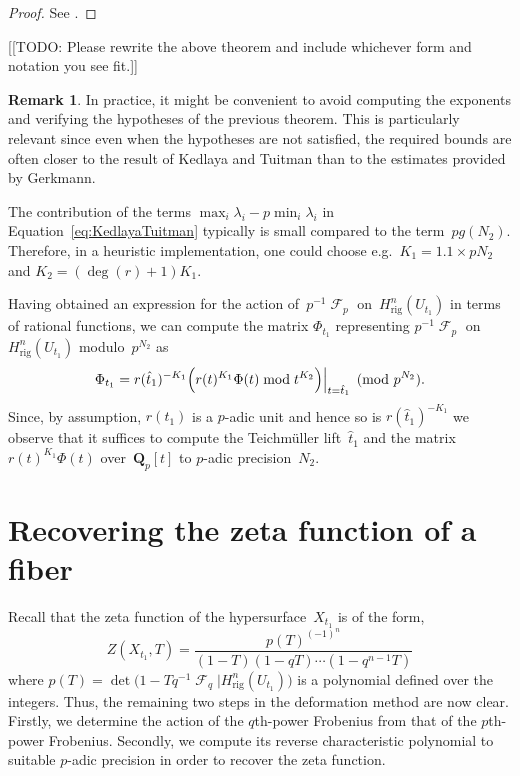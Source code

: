 \documentclass[a4paper,11pt]{article}
\numberwithin{equation}{section}
\DeclareMathOperator{\Frob}{\mathcal{F}} %
\providecommand{\Hrig}{H_{\text{rig}}}  %
\theoremstyle{definition}
\newtheorem{rem}[thm]{Remark}
\begin{document}
\begin{proof}
See \citep[Theorem~2.1]{KedlayaTuitman2012}.
\end{proof}

[[TODO:  Please rewrite the above theorem and include whichever 
form and notation you see fit.]]

\begin{rem} \label{rem:KedlayaTuitman}
In practice, it might be convenient to avoid computing the exponents and 
verifying the hypotheses of the previous theorem.  This is particularly 
relevant since even when the hypotheses are not satisfied, the required 
bounds are often closer to the result of Kedlaya and Tuitman than to the 
estimates provided by Gerkmann.

The contribution of the terms $\max_i \lambda_i - p \min_i \lambda_i$ 
in Equation~\eqref{eq:KedlayaTuitman} typically is small compared to the 
term~$p g(N_2)$. Therefore, in a heuristic implementation, one 
could choose e.g.\ $K_1 = 1.1 \times p N_2$ and $K_2 = (\deg(r) + 1) K_1$.
\end{rem}

Having obtained an expression for the action of~$p^{-1} \Frob_p$ 
on~$\Hrig^{n}(U_{t_1})$ in terms of rational functions, we can 
compute the matrix $\Phi_{t_1}$ representing $p^{-1} \Frob_p$ on 
$\Hrig^{n}(U_{t_1})$ modulo~$p^{N_2}$ as 
\begin{equation}
\Phi_{t_1} = 
    r(\hat{t}_1)^{-K_1} 
    \Bigl( r(t)^{K_1} \Phi(t) \bmod{t^{K_2}} \Bigr) \Big\vert_{t=\hat{t}_1} \pmod{p^{N_2}}.
\end{equation}
Since, by assumption, $r(t_1)$ is a $p$-adic unit and hence so is 
$r(\hat{t}_1)^{-K_1}$ we observe that it suffices to compute the 
Teichm\"uller lift~$\hat{t}_1$ and the matrix~$r(t)^{K_1} \Phi(t)$ 
over~$\mathbf{Q}_p[t]$ to $p$-adic precision~$N_2$.


\section{Recovering the zeta function of a fiber}
\label{sec:ZetaFunctions}

Recall that the zeta function of the hypersurface~$X_{t_1}$ is of the form,
\begin{equation}
Z(X_{t_1},T) = \frac{p(T)^{(-1)^n}}{(1 - T) (1 - qT) \dotsm (1 - q^{n-1}T)}
\end{equation}
where $p(T) = \det \bigl( 1 - T q^{-1} \Frob_q | \Hrig^n(U_{t_1}) \bigr)$ 
is a polynomial defined over the integers.
Thus, the remaining two steps in the deformation method are now clear.  
Firstly, we determine the action of the $q$th-power Frobenius 
from that of the $p$th-power Frobenius.  Secondly, we compute 
its reverse characteristic polynomial to suitable \mbox{$p$-adic} 
precision in order to recover the zeta function.
\end{document}
